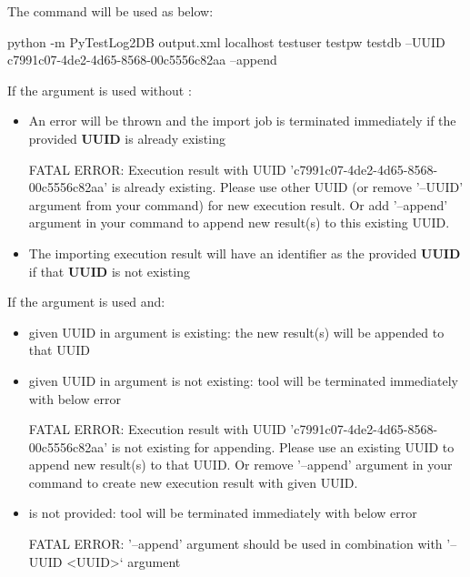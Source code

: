     The command will be used as below:
\begin{robotlog}
python -m PyTestLog2DB output.xml localhost testuser testpw testdb --UUID c7991c07-4de2-4d65-8568-00c5556c82aa --append
\end{robotlog}

    If the argument  is used without :
    \begin{itemize}
      \item An error will be thrown and the import job is terminated immediately
            if the provided \textbf{UUID} is already existing

\begin{robotlog}
FATAL ERROR: Execution result with UUID 'c7991c07-4de2-4d65-8568-00c5556c82aa' is already existing.
             Please use other UUID (or remove '--UUID' argument from your command) for new execution result.
             Or add '--append' argument in your command to append new result(s) to this existing UUID.
\end{robotlog}
      \item The importing execution result will have an identifier as the
            provided \textbf{UUID} if that \textbf{UUID} is not existing
    \end{itemize}

    If the argument  is used and:
    \begin{itemize}
      \item given UUID in  argument is existing:
            the new result(s) will be appended to that UUID
      \item given UUID in  argument is not existing:
            tool will be terminated immediately with below error
\begin{robotlog}
FATAL ERROR: Execution result with UUID 'c7991c07-4de2-4d65-8568-00c5556c82aa' is not existing for appending.
             Please use an existing UUID to append new result(s) to that UUID.
             Or remove '--append' argument in your command to create new execution result with given UUID.
\end{robotlog}
      \item {} is not provided:
            tool will be terminated immediately with below error
\begin{robotlog}
FATAL ERROR: '--append' argument should be used in combination with '--UUID <UUID>` argument
\end{robotlog}
    \end{itemize}

